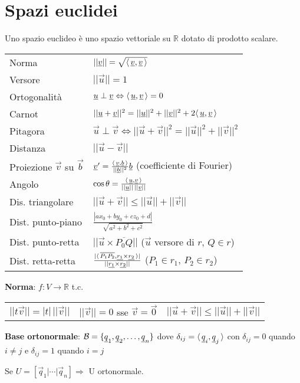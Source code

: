 \section{Spazi euclidei}

Uno spazio euclideo è uno spazio vettoriale su $\mathbb{R}$ dotato di prodotto scalare.

\begin{tabular}{ll}
	Norma & $||\underline{v}|| = \sqrt{\langle\,\underline{v},\underline{v}\,\rangle}$ \\
	Versore & $||\vec{u}|| = 1$ \\
	Ortogonalità & $\underline{u} \perp \underline{v} \Leftrightarrow \langle\,\underline{u},\underline{v}\,\rangle = 0$ \\
	Carnot & $||\underline{u}+\underline{v}||^2 = ||\underline{u}||^2+||\underline{v}||^2+2\langle\,\underline{u},\underline{v}\,\rangle$ \\
	Pitagora & $\vec{u} \perp \vec{v} \Leftrightarrow ||\vec{u}+\vec{v}||^2 = ||\vec{u}||^2+||\vec{v}||^2$ \\
	Distanza & $||\vec{u}-\vec{v}||$ \\
	Proiezione $\vec{v}$ su $\vec{b}$ & $\underline{v}' = \frac{\langle\,\underline{v},\underline{b}\,\rangle}{||\underline{b}||^2}\underline{b}$ (coefficiente di Fourier) \\
	Angolo & $\cos \theta = \frac{\langle\,\underline{u},\underline{v}\,\rangle}{||\underline{u}||\,||\underline{v}||}$ \\
	Dis. triangolare & $||\vec{u}+\vec{v}|| \le ||\vec{u}||+||\vec{v}||$ \\
	Dist. punto-piano & $\frac{|ax_0 + by_0 + cz_0 + d|}{\sqrt{a^2 + b^2 + c^2}}$ \\
	Dist. punto-retta & $||\vec{u} \times \overline{P_0Q}||$ ($\vec{u}$ versore di $r$, $Q \in r$) \\
	Dist. retta-retta & $\frac{|\langle\,\overline{P_1P_2},\underline{r_1} \times \underline{r_2}\,\rangle|}{||\underline{r_1} \times \underline{r_2}||}$ ($P_1 \in r_1$, $P_2 \in r_2$)
\end{tabular}

\textbf{Norma}: $f: V \rightarrow \mathbb{R}$ t.c.
\begin{tabular}{lll}
	$||t\vec{v}|| = |t|\,||\vec{v}||$ &
	$||\vec{v}|| = 0$ sse $\vec{v} = \vec{0}$ &
	$||\vec{u}+\vec{v}|| \le ||\vec{u}||+||\vec{v}||$
\end{tabular}

\textbf{Base ortonormale}: $\mathcal{B} = \{\underline{q}_1, \underline{q}_2, \dots, \underline{q}_n\}$ dove $\delta_{ij} = \langle\,\underline{q}_i,\underline{q}_j\,\rangle$ con $\delta_{ij} = 0$ quando $i \ne j$ e $\delta_{ij} = 1$ quando $i = j$

Se $U = [\vec{q}_1 | \cdots | \vec{q}_n] \Rightarrow$ U ortonormale.
